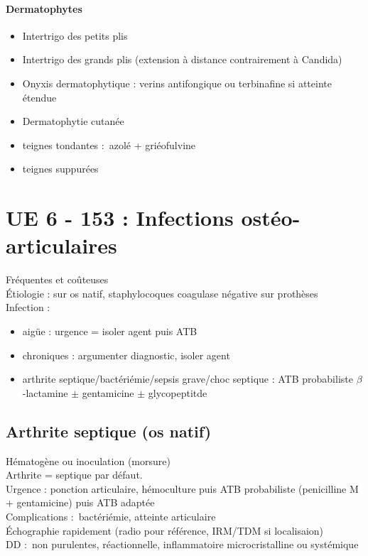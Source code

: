 \documentclass{article}
\newcommand*{\TakeFourierOrnament}[1]{{%
\fontencoding{U}\fontfamily{futs}\selectfont\char#1}}
\newcommand*{\danger}{\TakeFourierOrnament{66}}
\begin{document}
\paragraph{Dermatophytes}
\begin{itemize}
  \item Intertrigo des petits plis
  \item Intertrigo des grands plis (extension à distance contrairement à Candida)
  \item Onyxis dermatophytique : verins antifongique ou terbinafine si atteinte
    étendue
  \item Dermatophytie cutanée
  \item teignes tondantes : azolé + griéofulvine
  \item teignes suppurées
\end{itemize}

\section{UE 6 - 153 : Infections ostéo-articulaires}%
\label{sec:ue_6_153_infections_osteo_articulaires}
Fréquentes et coûteuses\\
Étiologie :  sur os natif, staphylocoques coagulase négative sur
prothèses\\
Infection :
\begin{itemize}
  \item aigüe : \danger urgence = isoler agent puis ATB
  \item chroniques : argumenter diagnostic, isoler agent
    \item arthrite septique/bactériémie/sepsis grave/choc septique : ATB
      probabiliste $\beta$-lactamine $\pm$ gentamicine $\pm$ glycopeptitde
\end{itemize}

\subsection{Arthrite septique (os natif)}
Hématogène ou inoculation (morsure)\\
Arthrite = septique par défaut. \\
Urgence \skull : ponction articulaire, hémoculture puis ATB probabiliste
(penicilline M + gentamicine) puis ATB adaptée\\
Complications : bactériémie, atteinte articulaire\\
Échographie rapidement (radio pour référence, IRM/TDM si localisaion)\\
DD : non purulentes, réactionnelle, inflammatoire microcristalline ou systémique
\end{document}
